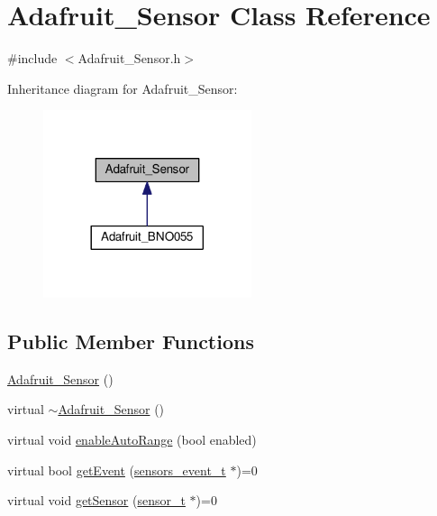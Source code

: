 \hypertarget{classAdafruit__Sensor}{}\section{Adafruit\+\_\+\+Sensor Class Reference}
\label{classAdafruit__Sensor}


{\ttfamily \#include $<$Adafruit\+\_\+\+Sensor.\+h$>$}



Inheritance diagram for Adafruit\+\_\+\+Sensor\+:
\nopagebreak
\begin{figure}[H]
\begin{center}
\leavevmode
\includegraphics[width=173pt]{classAdafruit__Sensor__inherit__graph}
\end{center}
\end{figure}
\subsection*{Public Member Functions}
\begin{DoxyCompactItemize}
\item 
\hyperlink{classAdafruit__Sensor_a1d06c6f2b9d014894f47102fc1effddf}{Adafruit\+\_\+\+Sensor} ()
\item 
virtual \hyperlink{classAdafruit__Sensor_ac98df73e0cd9367a226b96668417e2e6}{$\sim$\+Adafruit\+\_\+\+Sensor} ()
\item 
virtual void \hyperlink{classAdafruit__Sensor_ace6c1f26eeb956f95801b9fc1841f3a0}{enable\+Auto\+Range} (bool enabled)
\item 
virtual bool \hyperlink{classAdafruit__Sensor_a0636562b9bc853b796ecc87b5d4b1bec}{get\+Event} (\hyperlink{structsensors__event__t}{sensors\+\_\+event\+\_\+t} $\ast$)=0
\item 
virtual void \hyperlink{classAdafruit__Sensor_a19e844c1eb2dc37cb72705d5572c4676}{get\+Sensor} (\hyperlink{structsensor__t}{sensor\+\_\+t} $\ast$)=0
\end{DoxyCompactItemize}
